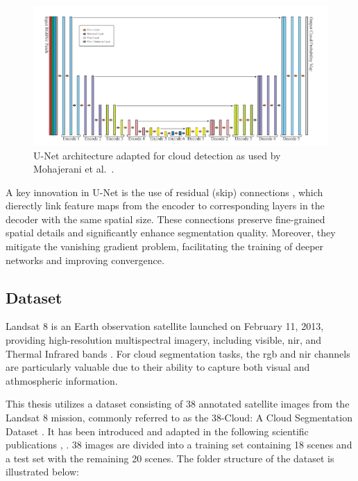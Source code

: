 {\begin{figure}[H]
  \centering
  \includegraphics[width=\textwidth]{files/U-Net_cloud_detection.png}
  \caption{U-Net architecture adapted for cloud detection as used by Mohajerani et al.~\cite{mohajerani2019cloudnet}.}
  \label{fig:unet-architecture}
\end{figure}


A key innovation in U-Net is the use of residual (skip) connections \cite{he2015deepresiduallearningimage}, which dierectly link feature maps from the encoder to corresponding layers in the decoder with the same spatial size. These connections preserve fine-grained spatial details and significantly enhance segmentation quality. Moreover, they mitigate the vanishing gradient problem, facilitating the training of deeper networks and improving convergence.

\subsection{Dataset}
\label{subsec:dataset}

Landsat 8 is an Earth observation satellite launched on February 11, 2013, providing high-resolution multispectral imagery, including visible, \gls{nir}, and Thermal Infrared bands \cite{landsat8}. For cloud segmentation tasks, the \gls{rgb} and \gls{nir} channels are particularly valuable due to their ability to capture both visual and athmospheric information.


This thesis utilizes a dataset consisting of 38 annotated satellite images from the Landsat 8 mission, commonly referred to as the 38-Cloud:
A Cloud Segmentation Dataset \cite{38cloud}.
It has been introduced and adapted in the following scientific publications \cite{CloudNet2019}, \cite{CloudDet2018}.
38 images are divided into a training set containing 18 scenes and a test set with the remaining 20 scenes.
The folder structure of the dataset is illustrated below:

}
